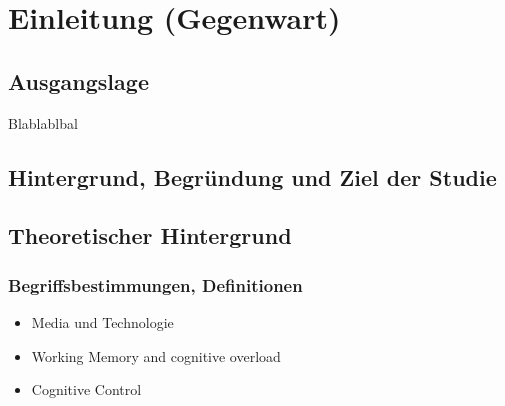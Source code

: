 %
%
\glsresetall
\let\raggedsection\centering 
\chapter{Einleitung (Gegenwart)}\label{chap.einleitung}
\let\raggedsection\raggedright 

\section{Ausgangslage}\label{section.ausgangslage}
Blablablbal

\section{Hintergrund, Begründung und Ziel der Studie}\label{section.hintergrund}
\section{Theoretischer Hintergrund}\label{section.theoHintegrund}
\subsection{Begriffsbestimmungen, Definitionen}
\label{subsection.begriffsbestimmung}
\begin{itemize}
    \item Media und Technologie \cite{Lin20091}
    \item Working Memory \cite{Mayer2003} and cognitive overload
    \item Cognitive Control
\end{itemize}

